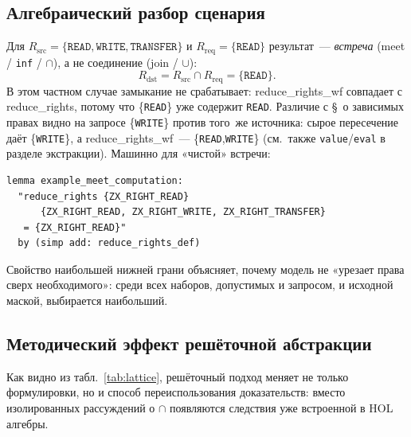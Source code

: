 \documentclass[11pt,a4paper]{article}
\newcommand{\isabel}[1]{{\isabelleit #1}}
\newcommand{\lemmaname}[1]{\isabel{#1}}
\begin{document}
\subsection{Алгебраический разбор сценария}

Для $R_{\mathrm{src}}=\{\mathtt{READ},\mathtt{WRITE},\mathtt{TRANSFER}\}$ и
$R_{\mathrm{req}}=\{\mathtt{READ}\}$ результат~--- \emph{встреча} (meet /
\texttt{inf} / $\cap$), а не соединение (join / $\cup$):
\[
	R_{\mathrm{dst}}
	= R_{\mathrm{src}} \cap R_{\mathrm{req}}
	= \{\mathtt{READ}\}.
\]
В этом частном случае замыкание не срабатывает:
\lemmaname{reduce\_rights\_wf} совпадает с \lemmaname{reduce\_rights},
потому что \{\texttt{READ}\} уже содержит \texttt{READ}. Различие с
\S~о зависимых правах видно на запросе \{\texttt{WRITE}\} против того~же
источника: сырое пересечение даёт \{\texttt{WRITE}\}, а
\lemmaname{reduce\_rights\_wf}~--- \{\texttt{READ},\texttt{WRITE}\}
(см.~также \texttt{value}/\texttt{eval} в разделе экстракции).
Машинно для «чистой» встречи:
\begin{lstlisting}
lemma example_meet_computation:
  "reduce_rights {ZX_RIGHT_READ}
      {ZX_RIGHT_READ, ZX_RIGHT_WRITE, ZX_RIGHT_TRANSFER}
   = {ZX_RIGHT_READ}"
  by (simp add: reduce_rights_def)
\end{lstlisting}
Свойство наибольшей нижней грани объясняет, почему модель не «урезает
права сверх необходимого»: среди всех наборов, допустимых и запросом, и
исходной маской, выбирается наибольший.

\subsection{Методический эффект решёточной абстракции}

Как видно из табл.~\ref{tab:lattice}, решёточный подход меняет не только
формулировки, но и способ переиспользования доказательств: вместо
изолированных рассуждений о $\cap$ появляются следствия уже встроенной в
HOL алгебры.
\end{document}
